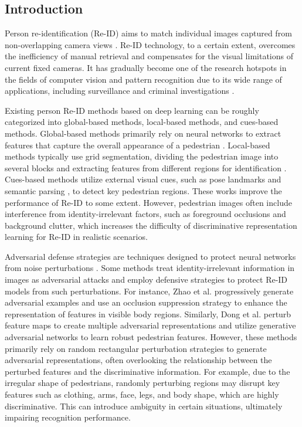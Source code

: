 \documentclass[12pt]{spieman}  %
\begin{document}
	\begin{spacing}{2}   %
		
		\section{Introduction}
		\label{sect:intro}  %
		Person re-identification (Re-ID) aims to match individual images captured from non-overlapping camera views \cite{nambiar2019gait}. Re-ID technology, to a certain extent, overcomes the inefficiency of manual retrieval and compensates for the visual limitations of current fixed cameras. It has gradually become one of the research hotspots in the fields of computer vision and pattern recognition due to its wide range of applications, including surveillance and criminal investigations \cite{zhang2024joint,wang2023multi,hu2024pose}.
		
		Existing person Re-ID methods based on deep learning can be roughly categorized into global-based methods, local-based methods, and cues-based methods. Global-based methods primarily rely on neural networks to extract features that capture the overall appearance of a pedestrian \cite{luo2019bag, ghorbel2022masking}. Local-based methods typically use grid segmentation, dividing the pedestrian image into several blocks and extracting features from different regions for identification \cite{sun2018beyond, zhang2021appearance}. Cues-based methods utilize external visual cues, such as pose landmarks \cite{miao2019pose} and semantic parsing \cite{guo2019beyond}, to detect key pedestrian regions. These works improve the performance of Re-ID to some extent. However, pedestrian images often include interference from identity-irrelevant factors, such as foreground occlusions and background clutter, which increases the difficulty of discriminative representation learning for Re-ID in realistic scenarios.
		
		Adversarial defense strategies are techniques designed to protect neural networks from noise perturbations \cite{szegedy2013intriguing, wang2020transferable, wang2022occluded}. Some methods treat identity-irrelevant information in images as adversarial attacks and employ defensive strategies to protect Re-ID models from such perturbations. For instance, Zhao et al. \cite{zhao2021incremental} progressively generate adversarial examples and use an occlusion suppression strategy to enhance the representation of features in visible body regions. Similarly, Dong et al. \cite{dong2023erasing} perturb feature maps to create multiple adversarial representations and utilize generative adversarial networks to learn robust pedestrian features. However, these methods primarily rely on random rectangular perturbation strategies to generate adversarial representations, often overlooking the relationship between the perturbed features and the discriminative information. For example, due to the irregular shape of pedestrians, randomly perturbing regions may disrupt key features such as clothing, arms, face, legs, and body shape, which are highly discriminative. This can introduce ambiguity in certain situations, ultimately impairing recognition performance.
		

\end{spacing}
\end{document}
